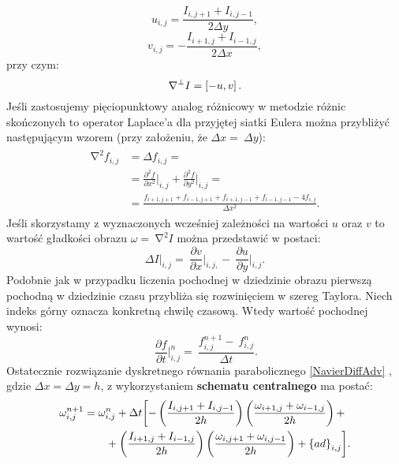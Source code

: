 \documentclass[12pt, twoside, openany]{report}
\theoremstyle{definition}
\begin{document}
\begin{equation}
u_{i,j}=\frac{I_{i,j+1}+I_{i,j-1}}{2\Delta y} 
\label{u}
,
\end{equation}
\begin{equation}
 v_{i,j}=-\frac{I_{i+1,j}+I_{i-1,j}}{2\Delta x}
\label{v}
,
\end{equation}
przy czym:
\begin{equation}\\
{\mathrm{\nabla }}^{\bot }I=\left[-u,v\right]
\label{gradI}
.
\end{equation}
Jeśli zastosujemy pięciopunktowy analog różnicowy w metodzie różnic skończonych to operator Laplace’a dla przyjętej siatki Eulera można przybliżyć następującym wzorem (przy założeniu, że $\Delta x=\ \Delta y$):
\begin{align}
\begin{aligned}
{\mathrm{\nabla }}^2f_{i,j} &= \Delta f_{i,j}=\\[1ex]
&={\frac{{\partial }^2f}{\partial x^2}}\bigg|_{i,j}+{\frac{{\partial }^2f}{\partial y^2}}\bigg|_{i,j}=\\
&=\frac{f_{i+1,j+1}+f_{i-1,j+1}+f_{i+1,j-1}+f_{i-1,j-1}-4f_{i,j}}{\Delta x^2} .
\end{aligned}
\label{LaplaceOpr}
\end{align}
Jeśli skorzystamy z wyznaczonych wcześniej zależności na wartości $u$ oraz $v$ to wartość gładkości obrazu $\omega =\ {\mathrm{\nabla }}^2I$ można przedstawić w postaci: 
\begin{equation}
\Delta {I}\big|_{i,j}=\ {\frac{\partial v}{\partial x}}\bigg|_{i,j,}-\ {\frac{\partial u}{\partial y}}\bigg|_{i,j}
\label{discreteVorticity}
.
\end{equation}
Podobnie jak w przypadku liczenia pochodnej w dziedzinie obrazu pierwszą pochodną w dziedzinie czasu przybliża się rozwinięciem w szereg Taylora. Niech indeks górny oznacza konkretną chwilę czasową. Wtedy wartość pochodnej wynosi:
\begin{equation}
\ {{\frac{\partial f}{\partial t}}\bigg|^n_{i,j}=\ \frac{f^{n+1}_{i,j}-\ f^n_{i,j}}{\Delta t}}
\label{dfdt}
.
\end{equation}
Ostatecznie rozwiązanie dyskretnego równania parabolicznego \eqref{NavierDiffAdv} , gdzie $\Delta x= \Delta y=h$, z wykorzystaniem \textbf{schematu centralnego} ma postać:
\begin{align}
\omega ^{n+1}_{i,j} &= {\omega }^n_{i,j}+\Delta t\biggl[
-\left(\frac{I_{i,j+1}+I_{i,j-1}}{2h}\right)\left(\frac{{\omega }_{i+1,j}
+{\omega }_{i-1,j}}{2h}\right)+\notag\\ 
&\qquad+ \left(\frac{I_{i+1,j}+I_{i-1,j}}{2h}\right)\left(\frac{{\omega }_{i,j+1}+{\omega }_{i,j-1}}{2h}\right)+{\left\{ad\right\}}_{i,j} \biggr].
\label{NavierDiffAdvCen}
\end{align}
\end{document}
